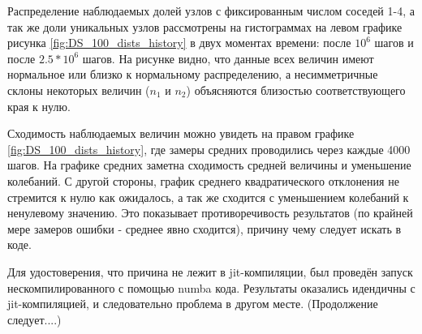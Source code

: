 Распределение наблюдаемых долей узлов с фиксированным числом соседей 1-4, а так же доли уникальных узлов рассмотрены на гистограммах на левом графике рисунка \ref{fig:DS_100_dists_history}  в двух моментах времени: после $10^6$ шагов и после $2.5 * 10^6$  шагов. На рисунке видно, что данные всех величин имеют нормальное или близко к нормальному распределению, а несимметричные склоны  некоторых величин ($n_1$ и $n_2$) объясняются близостью соответствующего края к нулю.

Сходимость наблюдаемых величин можно увидеть на правом графике \ref{fig:DS_100_dists_history}, где замеры средних проводились через каждые 4000 шагов. На графике средних заметна сходимость средней величины и уменьшение колебаний. С другой стороны, график среднего квадратического отклонения не стремится к нулю как ожидалось, а так же сходится с уменьшением колебаний к ненулевому значению. Это показывает противоречивость результатов (по крайней мере замеров ошибки - среднее явно сходится), причину чему следует искать в коде. 

Для удостоверения, что причина не лежит в jit-компиляции, был проведён запуск нескомпилированного с помощью numba кода. Результаты оказались идендичны с jit-компиляцией, и следовательно проблема в другом месте. (Продолжение следует....) 

